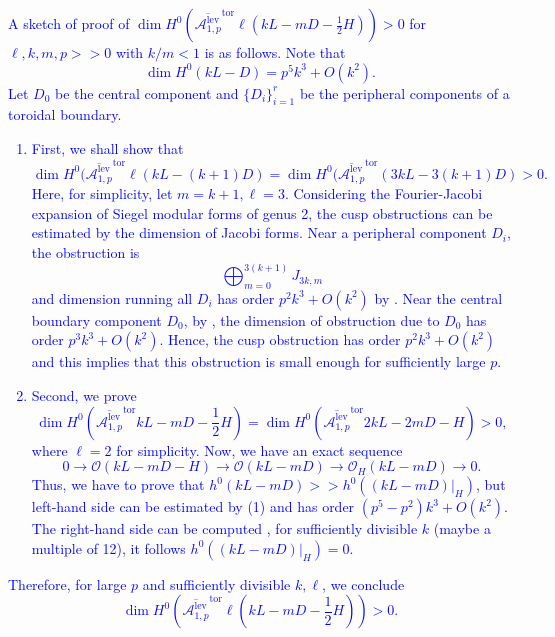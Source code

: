\documentclass[12pt, pdftex]{amsart}
\theoremstyle{plain}
\theoremstyle{definition}
\numberwithin{equation}{section}
\def\A{{\mathbb A}}
\def\dim{\mathop{\mathrm{dim}}\nolimits}
\def\tor{\mathrm{tor}}
\def\lev{\mathrm{lev}}
\def\OO{\mathscr{O}}
\def\A{\mathcal{A}}
\begin{document}
\textcolor{blue}{A sketch of proof of $\dim H^0(\overline{\A_{1,p}^{\lev}}^{\tor} \ell(kL-m D-\frac{1}{2}H))>0$ for $\ell, k, m, p>>0$ with $k/m<1$ is as follows.
Note that 
\[\dim H^0 (kL-D)=p^5k^3 + O(k^2).\]
Let $D_0$ be the central component and $\{D_i\}_{i=1}^r$ be the peripheral components of a toroidal boundary.
\begin{enumerate}
\item First, we shall show that
\[\dim H^0(\overline{\A_{1,p}^{\lev}}^{\tor} \ell(kL-(k+1) D)=\dim H^0(\overline{\A_{1,p}^{\lev}}^{\tor} (3kL-3(k+1) D)>0.\]
Here, for simplicity, let $m=k+1, \ell =3$.
Considering the Fourier-Jacobi expansion of Siegel modular forms of genus 2, the cusp obstructions can be estimated by the dimension of Jacobi forms.
Near a peripheral component $D_i$, the obstruction is 
\[\bigoplus_{m=0}^{3(k+1)}J_{3k, m}\]
and dimension running all $D_i$ has order $p^2 k^3 +O(k^2)$ by \cite[Proposition 3.2]{HS94}.
Near the central boundary component $D_0$, by \cite[Proposition 3.7]{HS94}, the dimension of obstruction due to $D_0$ has order $p^3 k^3 + O(k^2)$.
Hence, the cusp obstruction has order $p^2 k^3 + O(k^2)$ and this implies that this obstruction is small enough for sufficiently large $p$.
\item Second, we prove 
\[\dim H^0(\overline{\A_{1,p}^{\lev}}^{\tor} kL-mD-\frac{1}{2}H)=\dim H^0(\overline{\A_{1,p}^{\lev}}^{\tor} 2kL-2m D - H)>0,\]
where $\ell =2$ for simplicity.
Now, we have an exact sequence
\[0\to\OO(k L-mD-H)\to\OO(k L-mD)\to\OO_H(k L-mD)\to 0.\]
Thus, we have to prove that $h^0(k L-mD)>>h^0((k L-mD)\vert_H)$, but left-hand side can be estimated by (1) and has order $(p^5-p^2)k^3 +O(k^2)$.
The right-hand side can be computed \cite[Corollary 4.7, Theorem 4.19]{HS94}, for sufficiently divisible $k$ (maybe a multiple of 12), it follows $h^0((k L-mD)\vert_H)=0$.
\end{enumerate}
Therefore, for large $p$ and sufficiently divisible $k, \ell$, we conclude 
\[\dim H^0(\overline{\A_{1,p}^{\lev}}^{\tor} \ell(kL-m D-\frac{1}{2}H))>0.\]}
\end{document}
